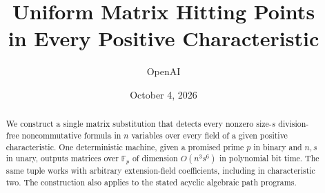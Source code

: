 \documentclass[11pt]{article}
\title{Uniform Matrix Hitting Points\\in Every Positive Characteristic}
\author{OpenAI}
\date{October 4, 2026}
\theoremstyle{definition}
\theoremstyle{remark}
\begin{document}
\maketitle
\begin{abstract}
We construct a single matrix substitution that detects every nonzero
size-$s$ division-free noncommutative formula in $n$ variables over every
field of a given positive characteristic. One deterministic machine,
given a promised prime $p$ in binary and $n,s$ in unary, outputs matrices
over $\mathbb F_p$ of dimension $O(n^3s^6)$ in polynomial bit time.
The same tuple works with arbitrary extension-field coefficients,
including in characteristic two. The construction also applies to the
stated acyclic algebraic path programs.
\end{abstract}







\end{document}
